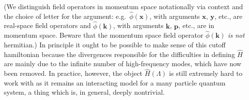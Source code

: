 \documentclass[11pt]{amsart}
\theoremstyle{plain}%
\theoremstyle{definition}
\theoremstyle{remark}
\begin{document}
(We distinguish field operators in momentum space notationally via context and the choice of letter for the argument: e.g.\ $\widehat{\phi}(\mathbf{x})$, with arguments $\mathbf{x}$, $\mathbf{y}$, etc., are real-space field operators and $\widehat{\phi}(\mathbf{k})$, with arguments $\mathbf{k}$, $\mathbf{p}$, etc., are in momentum space. Beware that the momentum space field operator $\widehat{\phi}(\mathbf{k})$ \emph{is not} hermitian.)
In principle it ought to be possible to make sense of this cutoff hamiltonian because the divergences responsible for the difficulties in defining $\widehat{H}$ are mainly due to the infinite number of high-frequency modes, which have now been removed. In practice, however, the object $\widehat{H}(\Lambda)$ is still extremely hard to work with as it remains an interacting model for a many particle quantum system, a thing which is, in general, deeply nontrivial.
\end{document}
